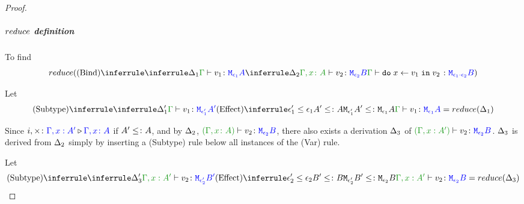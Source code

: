 \documentclass{report}
\begin{document}
\begin{framed}
\begin{proof}
        
                    \subparagraph{$reduce$ definition}
        
                    To find
                    \begin{equation}
                        \reduce(
                            \ntreeruleII{Bind}{
                                \treeruleI{
                                    \D_1
                                }{
                                    \gtyperelation{v_1}{\M{\e_1}{A}}
                                }
                                }{
                                \treeruleI{
                                    \D_2
                                }{
                                    \typerelation{\gax}{v_2}{\M{\e_2}{B}}
                                }
                            } {
                                \gtyperelation{\doin{x}{v_1}{v_2}}{\M{\e_1\dot\e_2}{B}}
                            }
                        )
                    \end{equation}
        
                    Let \begin{equation}
                        \ntreeruleII{Subtype}{
                            \treeruleI{\D'_1}{\gtyperelation{v_1}{\M{\e'_1}{A'}}}
                        }{
                            \subeffecttree{\e_1'}{A'}{\e_1}{A}
                        }{
                            \gtyperelation{v_1}{\M{\e_1}{A}}
                        } = \reduce(\D_1)
                    \end{equation}
        
                    Since $i,\times \colon {\color{blue}\Gamma, x: A'} \triangleright {\color {blue} \Gamma, x\colon A}$ if $A' \leq\colon A$, and by $\Delta_2$, $\typerelation{(\gax)}{v_2}{\M{\e_2}{B}}$, there also exists a derivation $\Delta_3$ of $\typerelation{(\G, x: A')}{v_2}{\M{\e_2}{B}}$. $\Delta_3$ is derived from $\Delta_2$ simply by inserting a (Subtype) rule below all instances of the (Var) rule.
        
                    Let \begin{equation}
                        \ntreeruleII{Subtype}{
                            \treeruleI{\D'_3}{\typerelation{\G, x: A'}{v_2}{\M{\e'_2}{B'}}}
                        }{
                            \subeffecttree{\e_2'}{B'}{\e_2}{B}
                        }{
                            \typerelation{\G, x: A'}{v_2}{\M{\e_2}{B}}
                        } = \reduce(\D_3)
                    \end{equation}
                    

\end{proof}
\end{framed}
\end{document}
